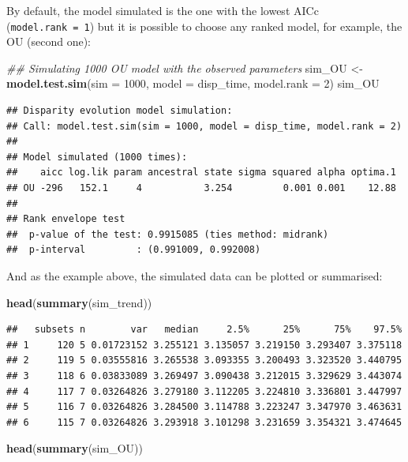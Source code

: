 \documentclass[]{book}
\newenvironment{Shaded}{\begin{snugshade}}{\end{snugshade}}
\newcommand{\CommentTok}[1]{\textcolor[rgb]{0.56,0.35,0.01}{\textit{#1}}}
\newcommand{\DataTypeTok}[1]{\textcolor[rgb]{0.13,0.29,0.53}{#1}}
\newcommand{\DecValTok}[1]{\textcolor[rgb]{0.00,0.00,0.81}{#1}}
\newcommand{\KeywordTok}[1]{\textcolor[rgb]{0.13,0.29,0.53}{\textbf{#1}}}
\newcommand{\NormalTok}[1]{#1}
\newcommand{\StringTok}[1]{\textcolor[rgb]{0.31,0.60,0.02}{#1}}
\begin{document}
By default, the model simulated is the one with the lowest AICc (\texttt{model.rank\ =\ 1}) but it is possible to choose any ranked model, for example, the OU (second one):

\begin{Shaded}
\begin{Highlighting}[]
\CommentTok{## Simulating 1000 OU model with the observed parameters}
\NormalTok{sim_OU <-}\StringTok{ }\KeywordTok{model.test.sim}\NormalTok{(}\DataTypeTok{sim =} \DecValTok{1000}\NormalTok{, }\DataTypeTok{model =}\NormalTok{ disp_time,}
                         \DataTypeTok{model.rank =} \DecValTok{2}\NormalTok{)}
\NormalTok{sim_OU}
\end{Highlighting}
\end{Shaded}

\begin{verbatim}
## Disparity evolution model simulation:
## Call: model.test.sim(sim = 1000, model = disp_time, model.rank = 2) 
## 
## Model simulated (1000 times):
##    aicc log.lik param ancestral state sigma squared alpha optima.1
## OU -296   152.1     4           3.254         0.001 0.001    12.88
## 
## Rank envelope test
##  p-value of the test: 0.9915085 (ties method: midrank)
##  p-interval         : (0.991009, 0.992008)
\end{verbatim}

And as the example above, the simulated data can be plotted or summarised:

\begin{Shaded}
\begin{Highlighting}[]
\KeywordTok{head}\NormalTok{(}\KeywordTok{summary}\NormalTok{(sim_trend))}
\end{Highlighting}
\end{Shaded}

\begin{verbatim}
##   subsets n        var   median     2.5%      25%      75%    97.5%
## 1     120 5 0.01723152 3.255121 3.135057 3.219150 3.293407 3.375118
## 2     119 5 0.03555816 3.265538 3.093355 3.200493 3.323520 3.440795
## 3     118 6 0.03833089 3.269497 3.090438 3.212015 3.329629 3.443074
## 4     117 7 0.03264826 3.279180 3.112205 3.224810 3.336801 3.447997
## 5     116 7 0.03264826 3.284500 3.114788 3.223247 3.347970 3.463631
## 6     115 7 0.03264826 3.293918 3.101298 3.231659 3.354321 3.474645
\end{verbatim}

\begin{Shaded}
\begin{Highlighting}[]
\KeywordTok{head}\NormalTok{(}\KeywordTok{summary}\NormalTok{(sim_OU))}
\end{Highlighting}
\end{Shaded}
\end{document}
